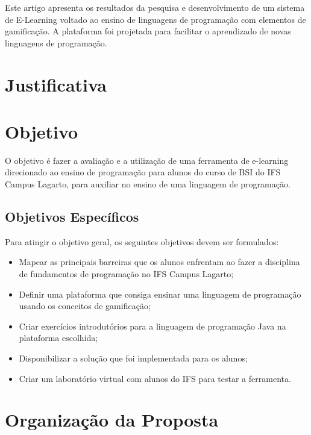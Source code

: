 \documentclass[
	12pt,				%
	oneside,			%
	a4paper,			%
	english,			%
	french,				%
	spanish,			%
	brazil				%
	]{abntex2}
\begin{document}
Este artigo apresenta os resultados da pesquisa e desenvolvimento de um
sistema de E-Learning voltado ao ensino de linguagens de programação com
elementos de gamificação. A plataforma foi projetada para facilitar o
aprendizado de novas linguagens de programação.

\hypertarget{justificativa}{%
\section{Justificativa}\label{justificativa}}

\hypertarget{objetivo}{%
\section{Objetivo}\label{objetivo}}

O objetivo é fazer a avaliação e a utilização de uma ferramenta de
e-learning direcionado ao ensino de programação para alunos do curso de
BSI do IFS Campus Lagarto, para auxiliar no ensino de uma linguagem de
programação.

\hypertarget{objetivos-especuxedficos}{%
\subsection{Objetivos Específicos}\label{objetivos-especuxedficos}}

Para atingir o objetivo geral, os seguintes objetivos devem ser
formulados:

\begin{itemize}
\tightlist
\item
  Mapear as principais barreiras que os alunos enfrentam ao fazer a
  disciplina de fundamentos de programação no IFS Campus Lagarto;
\item
  Definir uma plataforma que consiga ensinar uma linguagem de
  programação usando os conceitos de gamificação;
\item
  Criar exercícios introdutórios para a linguagem de programação Java na
  plataforma escolhida;
\item
  Disponibilizar a solução que foi implementada para os alunos;
\item
  Criar um laboratório virtual com alunos do IFS para testar a
  ferramenta.
\end{itemize}

\hypertarget{organizauxe7uxe3o-da-proposta}{%
\section{Organização da Proposta}\label{organizauxe7uxe3o-da-proposta}}
\end{document}
